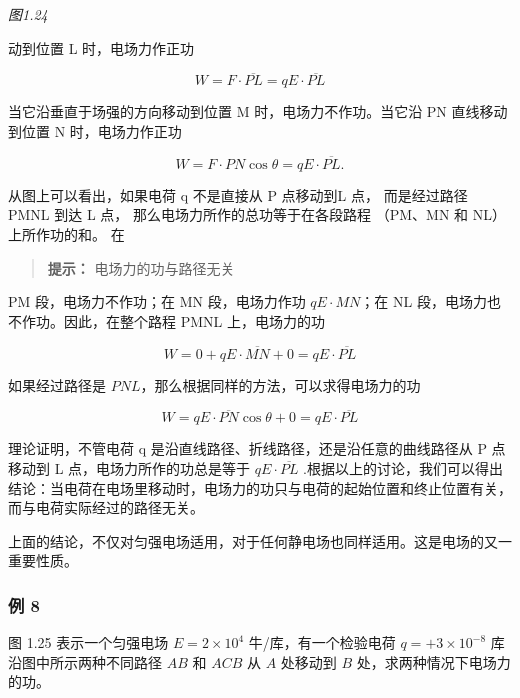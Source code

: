 \emph{图1.24}

动到位置 L 时，电场力作正功

\[
W = F \cdot \overline{PL} = qE \cdot \overline{PL}
\]

当它沿垂直于场强的方向移动到位置 M 时，电场力不作功。当它沿 PN
直线移动到位置 N 时，电场力作正功

\[
W = F \cdot PN \cos\theta = qE \cdot \overline{PL}.
\]

从图上可以看出，如果电荷 q 不是直接从 P 点移动到L 点， 而是经过路径 PMNL
到达 L 点， 那么电场力所作的总功等于在各段路程 （PM、MN 和 NL）
上所作功的和。 在

\begin{quote}
\textbf{提示：} 电场力的功与路径无关
\end{quote}

PM 段，电场力不作功；在 MN 段，电场力作功 \(qE \cdot MN\)；在 NL
段，电场力也不作功。因此，在整个路程 PMNL 上，电场力的功

\[
W = 0 + qE \cdot \overline{MN} + 0 = qE \cdot \overline{PL}
\]

如果经过路径是 \(PNL\)，那么根据同样的方法，可以求得电场力的功

\[
W = qE \cdot \overline{PN}\cos\theta + 0 = qE \cdot \overline{PL}
\]

理论证明，不管电荷 q 是沿直线路径、折线路径，还是沿任意的曲线路径从 P
点移动到 L 点，电场力所作的功总是等于 \(qE \cdot \overline{PL}\)
.根据以上的讨论，我们可以得出结论：当电荷在电场里移动时，电场力的功只与电荷的起始位置和终止位置有关，而与电荷实际经过的路径无关。

上面的结论，不仅对匀强电场适用，对于任何静电场也同样适用。这是电场的又一重要性质。

\subsubsection{例 8}\label{ux4f8b-8}

图 1.25 表示一个匀强电场 \(E=2\times10^{4}\) 牛/库，有一个检验电荷
\(q = +3 \times 10^{-8}\) 库沿图中所示两种不同路径 \(AB\) 和 \(ACB\) 从
\(A\) 处移动到 \(B\) 处，求两种情况下电场力的功。

